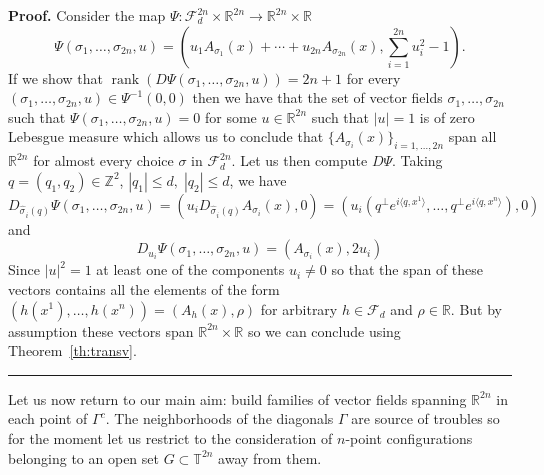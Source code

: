 \documentclass[11pt,a4paper]{article}%
\newenvironment{proof}[1][Proof]{\textbf{#1.} }{\ \rule{0.5em}{0.5em}}
\begin{document}
\begin{proof}
Consider the map $\Psi:  \mathcal{F}_{d}^{2 n} \times
\mathbb{R}^{2n} \rightarrow\mathbb{R}^{2 n}\times \mathbb{R}$
\[
\Psi(\sigma_{1}, \ldots, \sigma_{2 n}, u) = (u_{1} A_{\sigma_{1}} (x)
+ \cdots+ u_{2 n} A_{\sigma_{2 n}} (x) , \sum_{i=1}^{2n} u_i^2 -1).
\]
If we show that $\operatorname{rank}  (D \Psi(\sigma_{1}, \ldots, \sigma_{2
n}, u)) = 2  n+1$ for every $(\sigma_{1}, \ldots, \sigma_{2 n}, u)\in \Psi^{-1}(0,0)$  then we have
that the set  of vector fields $\sigma_{1}, \ldots, \sigma_{2 n}$ such that
$\Psi(\sigma_{1}, \ldots,  \sigma_{2 n}, u) = 0$ for some $u \in
\mathbb{R}^{2n}$ such that  $|u|=1$ is of zero Lebesgue measure  which allows us to conclude that
$\{A_{\sigma_{i}} (x)\}_{i = 1, \ldots, 2 n}$ span all
$\mathbb{R}^{2 n}$ for almost every choice  $\sigma$ in
$\mathcal{F}_{d}^{2n}$. Let us then compute $D \Psi$.  Taking
$q = (q_1, q_2)
\in\mathbb{Z}^2$, $ |q_1| \le d,\; |q_2| \le d$,
we have
\[
D_{\widehat{\sigma_{}}_{i} (q)} \Psi(\sigma_{1}, \ldots, \sigma_{2 n}, u) = (
u_{i} D_{\widehat{\sigma_{}}_{i} (q)} A_{\sigma_{i}} (x),0) = (u_{i}   ( q^{\bot} e^{i \langle q, x^{1} \rangle}, \ldots,q^{\bot} e^{i \langle q, x^{n} \rangle}), 0)
\]
and
\[
D_{u_{i}} \Psi(\sigma_{1}, \ldots, \sigma_{2 n}, u) = (A_{\sigma_i}(x),2 u_i)
\]
Since $|u|^2=1$ at least one of the components $u_i \neq 0$ so that the span of these vectors contains all the elements of the form
$
(h (x^{1}), \ldots, h (x^{n})) =  (A_{h} (x),\rho)
$
for arbitrary $h \in\mathcal{F}_{d}$ and $\rho\in\mathbb{R}$.
But by assumption these vectors span $\mathbb{R}^{2n}\times\mathbb{R}$ so we can conclude
using Theorem~\ref{th:transv}.
\end{proof}

\medskip

Let us now return to our main aim: build families of vector fields spanning
$\mathbb{R}^{2n}$ in each point of $\Gamma^{c}$.
The neighborhoods of the diagonals $\Gamma$ are source of troubles so for the
moment let us restrict to the consideration of $n$-point configurations
belonging to an open set $G\subset\mathbb{T}^{2n}$ away from them.
\end{document}
